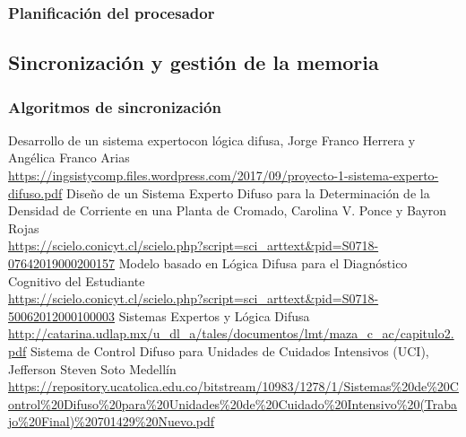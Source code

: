 \documentclass[a4paper, 11pt, titlepage]{article}
\begin{document}
        \subsubsection{Planificación del procesador}

    \subsection{Sincronización y gestión de la memoria}

        \subsubsection{Algoritmos de sincronización}

\newpage
\begin{thebibliography}{X}
    \bibitem{} Desarrollo de un sistema expertocon lógica difusa, Jorge Franco Herrera y Angélica Franco Arias \\ \url{https://ingsistycomp.files.wordpress.com/2017/09/proyecto-1-sistema-experto-difuso.pdf}
    \bibitem{} Diseño de un Sistema Experto Difuso para la Determinación de la Densidad de Corriente en una Planta de Cromado, Carolina V. Ponce y Bayron Rojas \\ \url{https://scielo.conicyt.cl/scielo.php?script=sci_arttext&pid=S0718-07642019000200157}
    \bibitem{} Modelo basado en Lógica Difusa para el Diagnóstico Cognitivo del Estudiante \\ \url{https://scielo.conicyt.cl/scielo.php?script=sci_arttext&pid=S0718-50062012000100003}
    \bibitem{} Sistemas Expertos y Lógica Difusa \\ \url{http://catarina.udlap.mx/u_dl_a/tales/documentos/lmt/maza_c_ac/capitulo2.pdf}
    \bibitem{} Sistema de Control Difuso para Unidades de Cuidados Intensivos (UCI), Jefferson Steven Soto Medellín \\ \url{https://repository.ucatolica.edu.co/bitstream/10983/1278/1/Sistemas%20de%20Control%20Difuso%20para%20Unidades%20de%20Cuidado%20Intensivo%20(Trabajo%20Final)%20701429%20Nuevo.pdf}
\end{thebibliography}
\end{document}
